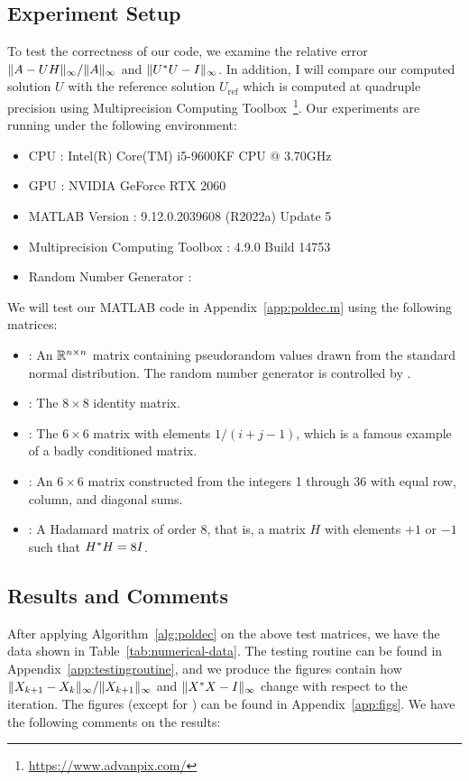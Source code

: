 \documentclass[12pt]{article}
\begin{document}
\subsection{Experiment Setup}
To test the correctness of our code, we examine the relative error $\|{A - UH}\|_{\infty}/\|{A}\|_\infty$ and $\|{U^* U - I}\|_\infty$. In addition, I will compare our computed solution $U$ with the reference solution $U_\mathrm{ref}$ which is computed at quadruple precision using Multiprecision Computing Toolbox~\footnote{\url{https://www.advanpix.com/}}.
Our experiments are running under the following environment:
\begin{itemize}
    \item CPU : Intel(R) Core(TM) i5-9600KF CPU @ 3.70GHz
    \item GPU : NVIDIA GeForce RTX 2060
    \item MATLAB Version : 9.12.0.2039608 (R2022a) Update 5
    \item Multiprecision Computing Toolbox : 4.9.0 Build 14753
    \item Random Number Generator : 
\end{itemize}

We will test our MATLAB code in Appendix~\ref{app:poldec.m} using the following matrices:
\begin{itemize}
    \item {} : An $\mathbb{R}^{n\times n}$ matrix containing pseudorandom values drawn
    from the standard normal distribution. The random number generator is controlled by .
    \item {} : The $8\times 8$ identity matrix.
    \item {} : The $6\times 6$ matrix with elements $1/(i+j-1)$, which is a
    famous example of a badly conditioned matrix.
    \item {} : An $6\times 6$ matrix constructed from the integers
    1 through 36 with equal row, column, and diagonal sums.
    \item {} : A Hadamard matrix of order 8, that is, a matrix $H$
    with elements $+1$ or $-1$ such that $H^* H = 8I$.
\end{itemize}

\subsection{Results and Comments}
After applying Algorithm~\ref{alg:poldec} on the above test matrices, we have the data shown in Table~\ref{tab:numerical-data}. The testing routine can be found in Appendix~\ref{app:testingroutine}, and we produce the figures contain how $\|{X_{k+1} - X_{k}}\|_\infty/\|{X_{k+1}}\|_\infty$ and $\|{X^* X - I}\|_\infty$ change with respect to the iteration. The figures (except for ) can be found in Appendix~\ref{app:figs}. We have the following comments on the results:
\end{document}
